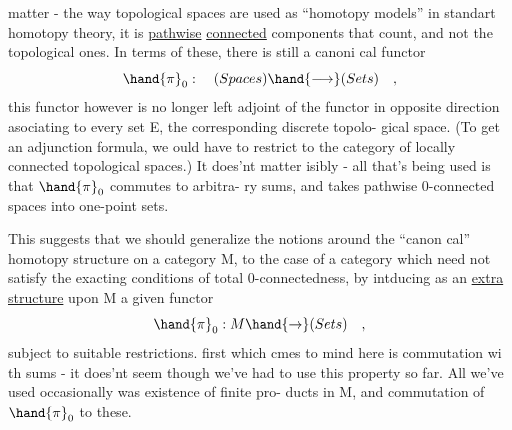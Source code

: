 matter -  the way topological spaces are used as ``homotopy models'' in
standart homotopy theory,  it is \uline{pathwise} \uline{connected} components that count,
and not the topological ones.  In terms of these,  there is still a canoni%
cal functor
\[ \hand{\pi}_0 : \quad (Spaces) \hand{\longrightarrow} (Sets) \quad , \]
this functor however is no longer left adjoint of the functor in opposite
direction\hand{,} asociating to every set E,  the corresponding discrete topolo-%
gical space. (To get an adjunction formula,  we ould have to restrict
to the category of  locally connected topological spaces.)  It does'nt
matter  isibly  -  all that's being used is that $\hand{\pi}_0$ commutes to arbitra-%
ry sums,  and takes pathwise 0-connected spaces into one-point sets.

This suggests that we should generalize the notions around the ``canon%
cal'' homotopy structure on a category M,  to the case of a category which
need not satisfy the exacting conditions of total 0-connectedness,  by
intducing as an \uline{extra}  \uline{structure}  upon M  a given functor
\[ \hand{\pi}_0 : M \hand{\rightarrow} (Sets) \quad , \]
subject  to suitable restrictions.   first which cmes to mind here is
commutation wi th sums  -  it does'nt seem though we've had to use this
property so far.  All we've used occasionally was existence of finite pro-%
ducts in M,  and commutation of $\hand{\pi}_0$ to these.

